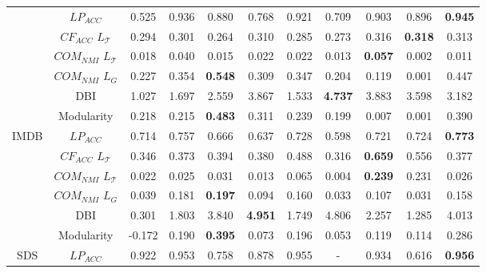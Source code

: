 \begin{table*}[t!]
{\begin{tabular}{ccccccccccc}
    & $LP_{ACC}$                    & 0.525     & 0.936         & 0.880         & 0.768     & 0.921     & 0.709     & 0.903         & 0.896  & \textbf{0.945}   \\
    & $CF_{ACC}$ $L_\mathcal{T}$    & 0.294     & 0.301         & 0.264         & 0.310     & 0.285     & 0.273     & 0.316         &\textbf{0.318} & 0.313     \\
    & $COM_{NMI}$ $L_\mathcal{T}$   & 0.018     & 0.040         & 0.015         & 0.022     & 0.022     & 0.013     &\textbf{0.057} & 0.002  & 0.011            \\
    & $COM_{NMI}$ $L_G$             & 0.227     & 0.354         & \textbf{0.548}& 0.309     & 0.347     & 0.204     & 0.119         & 0.001  & 0.447            \\
    & DBI                           & 1.027     & 1.697         & 2.559         & 3.867     & 1.533     &\textbf{4.737}& 3.883      & 3.598  & 3.182            \\
    & Modularity                    & 0.218     & 0.215         & \textbf{0.483}& 0.311     & 0.239     & 0.199     & 0.007         & 0.001  & 0.390            \\ \midrule
\multirow{6}{*}{IMDB}
    & $LP_{ACC}$                    & 0.714     & 0.757         & 0.666         & 0.637     & 0.728     & 0.598     & 0.721         & 0.724  & \textbf{0.773} \\
    & $CF_{ACC}$ $L_\mathcal{T}$    & 0.346     & 0.373         & 0.394         & 0.380     & 0.488     & 0.316     &\textbf{0.659} & 0.556  & 0.377 \\
    & $COM_{NMI}$ $L_\mathcal{T}$   & 0.022     & 0.025         & 0.031         & 0.013     & 0.065     & 0.004     &\textbf{0.239} & 0.231  & 0.026 \\
    & $COM_{NMI}$ $L_G$             & 0.039     & 0.181         &\textbf{0.197} & 0.094     & 0.160     & 0.033     & 0.107         & 0.031  & 0.158 \\
    & DBI                           & 0.301     & 1.803         & 3.840         &\textbf{4.951}& 1.749  & 4.806     & 2.257         & 1.285  & 4.013 \\
    & Modularity                    &-0.172     & 0.190         &\textbf{0.395} & 0.073     & 0.196     & 0.053     & 0.119         & 0.114  & 0.286 \\\midrule
\multirow{6}{*}{SDS}
    & $LP_{ACC}$                    & 0.922     & 0.953         & 0.758         & 0.878     & 0.955     &     -     & 0.934         & 0.616  & \textbf{0.956} \\

\end{tabular}}
\end{table*}
